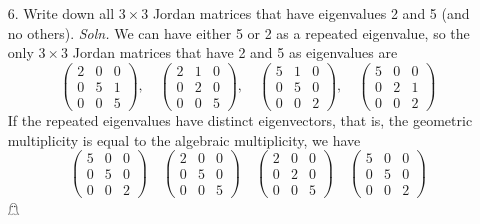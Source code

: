 \documentclass{article}
\begin{document}
\begin{itemize}
    \item[6.] Write down all $3 \times 3$ Jordan matrices that have eigenvalues 2 and 5 (and no others).
    \newline\newline
    \textit{Soln.} We can have either 5 or 2 as a repeated eigenvalue, so the only $3\times 3$ Jordan matrices that have 2 and 5 as eigenvalues are
    \[\begin{pmatrix}
        2 & 0 & 0\\
        0 & 5 & 1\\
        0 & 0 & 5
    \end{pmatrix}, \hspace{1em}
    \begin{pmatrix}
        2 & 1 & 0\\
        0 & 2 & 0\\
        0 & 0 & 5
    \end{pmatrix}, \hspace{1em}
    \begin{pmatrix}
        5 & 1 & 0\\
        0 & 5 & 0\\
        0 & 0 & 2
    \end{pmatrix}, \hspace{1em}
    \begin{pmatrix}
        5 & 0 & 0\\
        0 & 2 & 1\\
        0 & 0 & 2
    \end{pmatrix}\]
    If the repeated eigenvalues have distinct eigenvectors, that is, the geometric multiplicity is equal to the algebraic multiplicity, we have
    \[\begin{pmatrix}
        5 & 0 & 0\\
        0 & 5 & 0\\
        0 & 0 & 2
    \end{pmatrix} \hspace{1em}
    \begin{pmatrix}
        2 & 0 & 0\\
        0 & 5 & 0\\
        0 & 0 & 5
    \end{pmatrix}\hspace{1em}
    \begin{pmatrix}
        2 & 0 & 0\\
        0 & 2 & 0\\
        0 & 0 & 5
    \end{pmatrix}\hspace{1em}
    \begin{pmatrix}
        5 & 0 & 0\\
        0 & 5 & 0\\
        0 & 0 & 2
    \end{pmatrix}\]
    \hfill $\mathghost$
    

\end{itemize}
\end{document}

